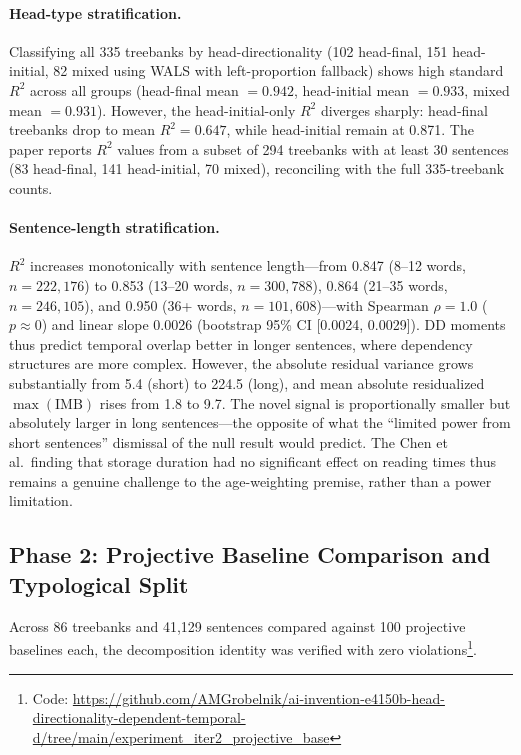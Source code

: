 \documentclass[11pt,letterpaper]{article}
\begin{document}
\paragraph{Head-type stratification.} Classifying all 335 treebanks by head-directionality (102 head-final, 151 head-initial, 82 mixed using WALS with left-proportion fallback) shows high standard $R^2$ across all groups (head-final mean $= 0.942$, head-initial mean $= 0.933$, mixed mean $= 0.931$). However, the head-initial-only $R^2$ diverges sharply: head-final treebanks drop to mean $R^2 = 0.647$, while head-initial remain at 0.871. The paper reports $R^2$ values from a subset of 294 treebanks with at least 30 sentences (83 head-final, 141 head-initial, 70 mixed), reconciling with the full 335-treebank counts.

\paragraph{Sentence-length stratification.} $R^2$ increases monotonically with sentence length---from 0.847 (8--12 words, $n = 222{,}176$) to 0.853 (13--20 words, $n = 300{,}788$), 0.864 (21--35 words, $n = 246{,}105$), and 0.950 (36+ words, $n = 101{,}608$)---with Spearman $\rho = 1.0$ ($p \approx 0$) and linear slope 0.0026 (bootstrap 95\% CI [0.0024, 0.0029]). DD moments thus predict temporal overlap better in longer sentences, where dependency structures are more complex. However, the absolute residual variance grows substantially from 5.4 (short) to 224.5 (long), and mean absolute residualized $\max(\text{IMB})$ rises from 1.8 to 9.7. The novel signal is proportionally smaller but absolutely larger in long sentences---the opposite of what the ``limited power from short sentences'' dismissal of the \citet{Chen2005} null result would predict. The Chen et al.\ finding that storage duration had no significant effect on reading times thus remains a genuine challenge to the age-weighting premise, rather than a power limitation.


\subsection{Phase 2: Projective Baseline Comparison and Typological Split}
\label{sec:typological_split}

Across 86 treebanks and 41,129 sentences compared against 100 projective baselines each, the decomposition identity was verified with zero violations\footnote{Code: \url{https://github.com/AMGrobelnik/ai-invention-e4150b-head-directionality-dependent-temporal-d/tree/main/experiment_iter2_projective_base}}.
\end{document}
